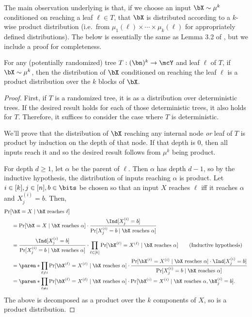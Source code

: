 The main observation underlying  is that, if we choose an input $\bX \sim \mu^k$ conditioned on reaching a leaf $\ell \in T$, that $\bX$ is distributed according to a $k$-wise product distribution (i.e.~from $\mu_1(\ell) \times \cdots \times \mu_k(\ell)$ for appropriately defined distributions). The below is essentially the same as  Lemma 3.2 of \cite{Dru12}, but we include a proof for completeness.
\begin{claim}
    \label{claim:leaf-product}
    For any (potentially randomized) tree $T:(\bn)^k \to \mcY$ and leaf $\ell$ of $T$, if $\bX \sim \mu^k$, then the distribution of $\bX$ conditioned on reaching the leaf $\ell$ is a product distribution over the $k$ blocks of $\bX$.
\end{claim}
\begin{proof}
    First, if $T$ is a randomized tree, it is as a distribution over deterministic trees. If the desired result holds for each of those deterministic trees, it also holds for $T$. Therefore, it suffices to consider the case where $T$ is deterministic.

    We'll prove that the distribution of $\bX$ reaching any internal node \emph{or} leaf of $T$ is product by induction on the depth of that node. If that depth is $0$, then all inputs reach it and so the desired result follows from $\mu^k$ being product.

    For depth $d \geq 1$, let $\alpha$ be the parent of $\ell$. Then $\alpha$ has depth $d-1$, so by the inductive hypothesis, the distribution of inputs reaching $\alpha$ is product. Let $i \in [k], j \in [n], b \in \bits$ be chosen so that an input $X$ reaches $\ell$ iff it reaches $\alpha$ and $X^{(i)}_j = b$. Then,
    \begin{align*}
        \Pr[&\bX =X \mid \bX \text{ reaches } \ell] \\
        &= \Pr[\bX =X\mid \bX \text{ reaches } \alpha] \cdot \frac{\Ind[X^{(i)}_j = b]}{\Pr[X^{(i)}_j=b \mid \bX \text{ reaches } \alpha]} \\
         &= \frac{\Ind[X^{(i)}_j = b]}{\Pr[X^{(i)}_j =b\mid \bX \text{ reaches } \alpha]} \cdot \prod_{\ell \in [k]}  \Pr[\bX^{(\ell)} =X^{(\ell)}\mid \bX \text{ reaches } \alpha] \tag{Inductive hypothesis}\\
         &= \paren*{\prod_{\ell \neq i}  \Pr[\bX^{(\ell)} =X^{(\ell)}\mid \bX \text{ reaches } \alpha]} \cdot \frac{\Pr[\bX^{(i)} =X^{(i)}\mid \bX \text{ reaches } \alpha] \cdot \Ind[X^{(i)}_j = b]}{\Pr[X^{(i)}_j =b\mid \bX \text{ reaches } \alpha]}\\
         &= \paren*{\prod_{\ell \neq i}  \Pr[\bX^{(\ell)} =X^{(\ell)}\mid \bX \text{ reaches } \alpha]} \cdot \Pr[\bX^{(i)} =X^{(i)}\mid \bX \text{ reaches } \alpha, \bX^{(i)}_j = b].
    \end{align*}
    The above is decomposed as a product over the $k$ components of $X$, so is a product distribution.
\end{proof}
